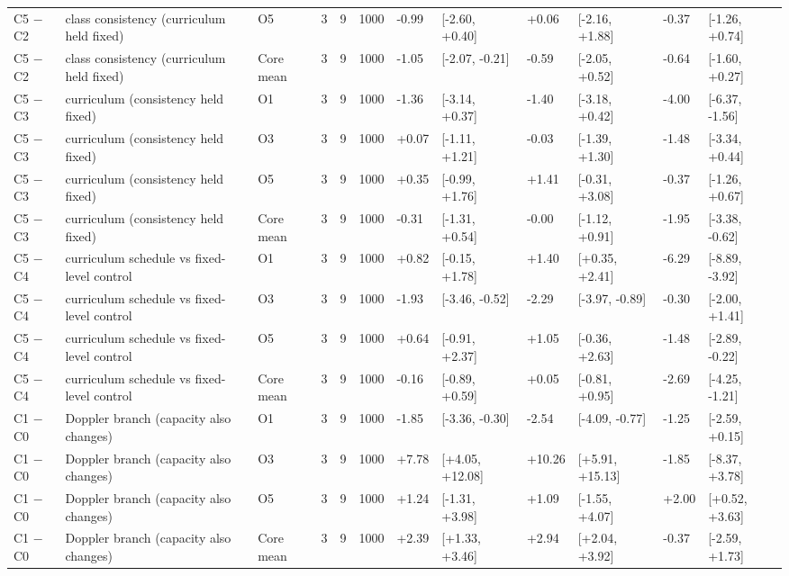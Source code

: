\begin{table}[t]
\begin{tabular}{llllllllllll}
C5 $-$ C2 & class consistency (curriculum held fixed) & O5 & 3 & 9 & 1000 & -0.99 & [-2.60, +0.40] & +0.06 & [-2.16, +1.88] & -0.37 & [-1.26, +0.74] \\
C5 $-$ C2 & class consistency (curriculum held fixed) & Core mean & 3 & 9 & 1000 & -1.05 & [-2.07, -0.21] & -0.59 & [-2.05, +0.52] & -0.64 & [-1.60, +0.27] \\
C5 $-$ C3 & curriculum (consistency held fixed) & O1 & 3 & 9 & 1000 & -1.36 & [-3.14, +0.37] & -1.40 & [-3.18, +0.42] & -4.00 & [-6.37, -1.56] \\
C5 $-$ C3 & curriculum (consistency held fixed) & O3 & 3 & 9 & 1000 & +0.07 & [-1.11, +1.21] & -0.03 & [-1.39, +1.30] & -1.48 & [-3.34, +0.44] \\
C5 $-$ C3 & curriculum (consistency held fixed) & O5 & 3 & 9 & 1000 & +0.35 & [-0.99, +1.76] & +1.41 & [-0.31, +3.08] & -0.37 & [-1.26, +0.67] \\
C5 $-$ C3 & curriculum (consistency held fixed) & Core mean & 3 & 9 & 1000 & -0.31 & [-1.31, +0.54] & -0.00 & [-1.12, +0.91] & -1.95 & [-3.38, -0.62] \\
C5 $-$ C4 & curriculum schedule vs fixed-level control & O1 & 3 & 9 & 1000 & +0.82 & [-0.15, +1.78] & +1.40 & [+0.35, +2.41] & -6.29 & [-8.89, -3.92] \\
C5 $-$ C4 & curriculum schedule vs fixed-level control & O3 & 3 & 9 & 1000 & -1.93 & [-3.46, -0.52] & -2.29 & [-3.97, -0.89] & -0.30 & [-2.00, +1.41] \\
C5 $-$ C4 & curriculum schedule vs fixed-level control & O5 & 3 & 9 & 1000 & +0.64 & [-0.91, +2.37] & +1.05 & [-0.36, +2.63] & -1.48 & [-2.89, -0.22] \\
C5 $-$ C4 & curriculum schedule vs fixed-level control & Core mean & 3 & 9 & 1000 & -0.16 & [-0.89, +0.59] & +0.05 & [-0.81, +0.95] & -2.69 & [-4.25, -1.21] \\
C1 $-$ C0 & Doppler branch (capacity also changes) & O1 & 3 & 9 & 1000 & -1.85 & [-3.36, -0.30] & -2.54 & [-4.09, -0.77] & -1.25 & [-2.59, +0.15] \\
C1 $-$ C0 & Doppler branch (capacity also changes) & O3 & 3 & 9 & 1000 & +7.78 & [+4.05, +12.08] & +10.26 & [+5.91, +15.13] & -1.85 & [-8.37, +3.78] \\
C1 $-$ C0 & Doppler branch (capacity also changes) & O5 & 3 & 9 & 1000 & +1.24 & [-1.31, +3.98] & +1.09 & [-1.55, +4.07] & +2.00 & [+0.52, +3.63] \\
C1 $-$ C0 & Doppler branch (capacity also changes) & Core mean & 3 & 9 & 1000 & +2.39 & [+1.33, +3.46] & +2.94 & [+2.04, +3.92] & -0.37 & [-2.59, +1.73] \\
\hline
\end{tabular}
\end{table}
